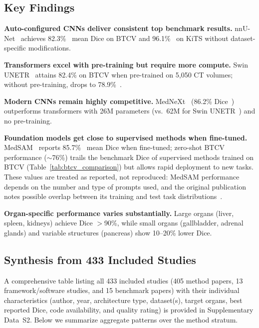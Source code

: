 \subsection{Key Findings}

\textbf{Auto-configured CNNs deliver consistent top benchmark results.} nnU-Net~\cite{isensee2021nnunet} achieves 82.3\%~\cite{isensee2021nnunet} mean Dice on BTCV and 96.1\%~\cite{isensee2021nnunet} on KiTS without dataset-specific modifications.

\textbf{Transformers excel with pre-training but require more compute.} Swin UNETR~\cite{tang2022selfsupervised} attains 82.4\% on BTCV when pre-trained on 5,050 CT volumes; without pre-training, drops to 78.9\%~\cite{tang2022selfsupervised}.

\textbf{Modern CNNs remain highly competitive.} MedNeXt~\cite{roy2023mednext} (86.2\% Dice~\cite{roy2023mednext}) outperforms transformers with 26M parameters (vs.\ 62M for Swin UNETR~\cite{swinunetr2022}) and no pre-training.

\textbf{Foundation models get close to supervised methods when fine-tuned.} MedSAM~\cite{ma2024medsam} reports 85.7\%~\cite{ma2024medsam} mean Dice when fine-tuned; zero-shot BTCV performance ($\sim$76\%) trails the benchmark Dice of supervised methods trained on BTCV (Table~\ref{tab:btcv_comparison}) but allows rapid deployment to new tasks. These values are treated as reported, not reproduced: MedSAM performance depends on the number and type of prompts used, and the original publication notes possible overlap between its training and test task distributions~\cite{ma2024medsam}.

\textbf{Organ-specific performance varies substantially.} Large organs (liver, spleen, kidneys) achieve Dice $>$90\%, while small organs (gallbladder, adrenal glands) and variable structures (pancreas) show 10--20\% lower Dice.

\subsection{Synthesis from 433 Included Studies}

A comprehensive table listing all 433 included studies (405 method papers, 13 framework/software studies, and 15 benchmark papers) with their individual characteristics (author, year, architecture type, dataset(s), target organs, best reported Dice, code availability, and quality rating) is provided in Supplementary Data~S2. Below we summarize aggregate patterns over the method stratum.

